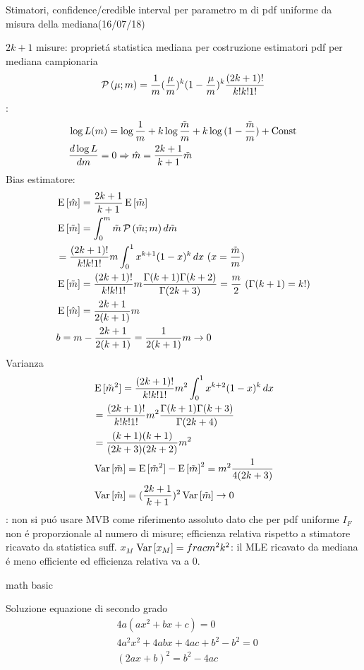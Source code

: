 \begin{wordonframe}{Stimatori, confidence/credible interval per parametro m di pdf uniforme da misura della mediana(16/07/18)}
	\begin{block}{$2k+1$ misure: propriet\'a statistica mediana per costruzione estimatori}
		pdf per mediana campionaria
		\begin{equation*}
		\prob{(\mu;m)}=\frac{1}{m}(\frac{\mu}{m})^k(1-\frac{\mu}{m})^k\frac{(2k+1)!}{k!k!1!}
		\end{equation*}
		:
		\begin{align*}
		&\log{L(m)}=\log{\frac{1}{m}}+k\log{\frac{\tilde{m}}{m}}+k\log{(1-\frac{\tilde{m}}{m})}+\const{}\\
		&\TDy{m}{\log{L}}=0 \Rightarrow \hat{m}=\frac{2k+1}{k+1}\tilde{m}
		\end{align*}
		Bias estimatore:
		\begin{align*}
		&\E{[\hat{m}]}=\frac{2k+1}{k+1}\E{[\tilde{m}]}\\
		&\E{[\tilde{m}]}=\int_0^m\tilde{m}\prob{(\tilde{m};m)}\,d\tilde{m}\\
		&=\frac{(2k+1)!}{k!k!1!}m\int_0^1x^{k+1}(1-x)^k\,dx\ (x=\frac{\tilde{m}}{m})\\
		&\E{[\tilde{m}]}=\frac{(2k+1)!}{k!k!1!}m\frac{\Gamma(k+1)\Gamma(k+2)}{\Gamma(2k+3)}=\frac{m}{2}\ (\Gamma(k+1)=k!)\\
		&\E{[\hat{m}]}=\frac{2k+1}{2(k+1)}m\\
		&b=m-\frac{2k+1}{2(k+1)}=\frac{1}{2(k+1)}m\to0
		\end{align*}
		Varianza
		\begin{align*}
		&\E{[\tilde{m}^2]}=\frac{(2k+1)!}{k!k!1!}m^2\int_0^1x^{k+2}(1-x)^k\,dx\\
		&=\frac{(2k+1)!}{k!k!1!}m^2\frac{\Gamma(k+1)\Gamma(k+3)}{\Gamma(2k+4)}\\
		&=\frac{(k+1)(k+1)}{(2k+3)(2k+2)}m^2\\
		&\var{[\tilde{m}]}=\E{[\tilde{m}^2]}-\E{[\tilde{m}]}^2=m^2\frac{1}{4(2k+3)}\\
		&\var{[\hat{m}]}=(\frac{2k+1}{k+1})^2\var{[\tilde{m}]}\to0
		\end{align*}
		: non si pu\'o usare MVB come riferimento assoluto dato che per pdf uniforme $I_F$ non \'e proporzionale al numero di misure; efficienza relativa rispetto a stimatore ricavato da statistica suff. $x_M$ $\var{[x_M]}=frac{m^2}{k^2}$: il MLE ricavato da mediana \'e meno efficiente ed efficienza relativa va a 0.
	\end{block}
\end{wordonframe}

\begin{wordonframe}{math basic}
\begin{block}{Soluzione equazione di secondo grado}
\begin{align*}
&4a(ax^2+bx+c)=0\\
&4a^2x^2+4abx+4ac+b^2-b^2=0\\
&(2ax+b)^2=b^2-4ac
\end{align*}
\end{block}

\end{wordonframe}
